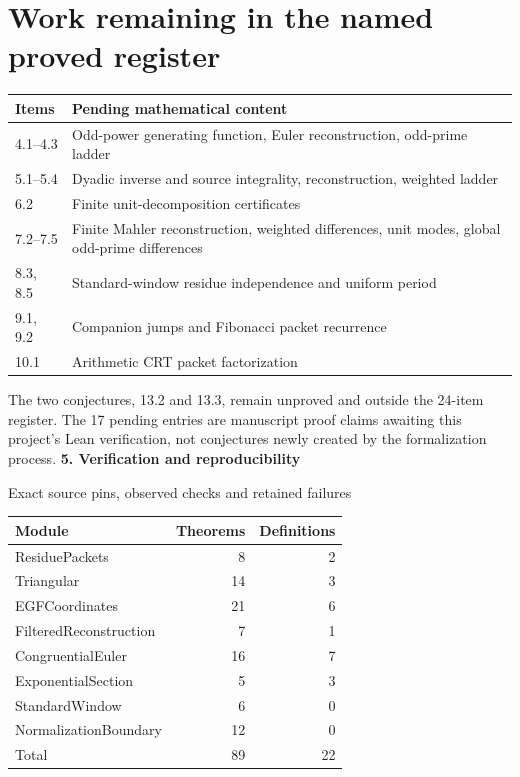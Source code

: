 \documentclass[11pt]{article}
\newcommand{\pageheading}[2]{{\Large\bfseries\color{ink}#1}\par{\small #2}\par\medskip}
\begin{document}
\section*{Work remaining in the named proved register}
\begin{center}\small
\begin{tabular}{@{}p{}p{}@{}}
\toprule
Items & Pending mathematical content\\\midrule
4.1--4.3 & Odd-power generating function, Euler reconstruction, odd-prime ladder\\
5.1--5.4 & Dyadic inverse and source integrality, reconstruction, weighted ladder\\
6.2 & Finite unit-decomposition certificates\\
7.2--7.5 & Finite Mahler reconstruction, weighted differences, unit modes, global odd-prime differences\\
8.3, 8.5 & Standard-window residue independence and uniform period\\
9.1, 9.2 & Companion jumps and Fibonacci packet recurrence\\
10.1 & Arithmetic CRT packet factorization\\\bottomrule
\end{tabular}\end{center}
The two conjectures, 13.2 and 13.3, remain unproved and outside the 24-item register. The 17 pending entries are manuscript proof claims awaiting this project's Lean verification, not conjectures newly created by the formalization process.
\newpage
\pageheading{5. Verification and reproducibility}{Exact source pins, observed checks and retained failures}
\begin{center}\small
\begin{tabular}{@{}lrr@{}}\toprule
Module & Theorems & Definitions\\\midrule
ResiduePackets & 8 & 2\\
Triangular & 14 & 3\\
EGFCoordinates & 21 & 6\\
FilteredReconstruction & 7 & 1\\
CongruentialEuler & 16 & 7\\
ExponentialSection & 5 & 3\\
StandardWindow & 6 & 0\\
NormalizationBoundary & 12 & 0\\\midrule
Total & 89 & 22\\\bottomrule
\end{tabular}\end{center}
\end{document}
